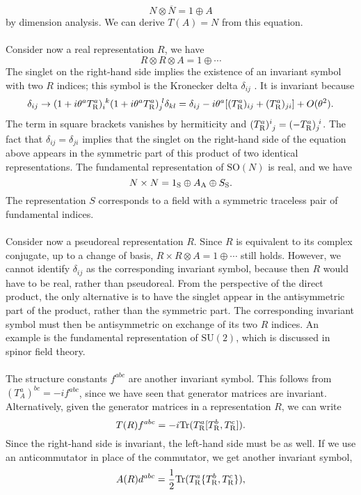 \[N \otimes \overline{N} = 1 \oplus A \]
by dimension analysis. We can derive $T(A) = N$ from this equation.
\\ \\
Consider now a real representation $R$, we have
\[R \otimes R \otimes A = 1 \oplus \cdots\]
The singlet on the right-hand side implies the existence of an invariant symbol with two $R$ indices; this symbol is the Kronecker delta $\delta_{ij}$ . It is invariant because
\[\delta_{ij} \to (1+i\theta^a T^a_{\rm R})_{i}^{\phantom{i}k} (1+i\theta^a T^a_{\rm R})_{j}^{\phantom{i}l}\delta_{kl} = \delta_{ij} - i\theta^a [(T^a_{\rm R})_{ij} + (T^a_{\rm R})_{ji}] + O(\theta^2).\]
The term in square brackets vanishes by hermiticity and $(T^{a}_{\rm R})^{i}_{\phantom{i}j} = (-T^{a}_{\rm R})_{j}^{\phantom{i}i}$. 
The fact that $\delta_{ij} = \delta_{ji}$ implies that the singlet on the right-hand side of the equation above appears in the symmetric part of this product of two identical representations.
The fundamental representation of $\mathrm{SO}(N)$ is real, and we have
\[N \times N = 1_{\rm S} \oplus A_{\rm A} \oplus S_{\rm S}.\]
The representation $S$ corresponds to a field with a symmetric traceless pair of fundamental indices.
\\ \\
Consider now a pseudoreal representation $R$. Since $R$ is equivalent to its complex conjugate, up to a change of basis, $R \times R \otimes A = 1 \oplus \cdots$  still holds. However, we cannot identify $\delta_{ij}$ as the corresponding invariant symbol, because then $R$ would have to be real, rather than pseudoreal. 
From the perspective of the direct product, the only alternative is to have the singlet appear in the antisymmetric part of the product, rather than the symmetric part. The corresponding invariant symbol must then be antisymmetric on exchange of its two $R$ indices.
An example is the fundamental representation of $\mathrm{SU}(2)$, which is discussed in spinor field theory.
\\ \\
The structure constants $f^{abc}$ are another invariant symbol. This follows from $(T^a_A)^{bc} = -if^{abc}$, since we have seen that generator matrices are invariant.
Alternatively, given the generator matrices in a representation $R$, we can write
\[T(R)f^{abc} = -i \mathrm{Tr}(T^a_{\rm R}[T^b_{\rm R},T^c_{\rm R}]).\]
Since the right-hand side is invariant, the left-hand side must be as well.
If we use an anticommutator in place of the commutator, we get another invariant symbol,
\[A(R)d^{abc} = \frac{1}{2} \mathrm{Tr}(T^a_{\rm R}\{T^b_{\rm R},T^c_{\rm R}\}),\]
